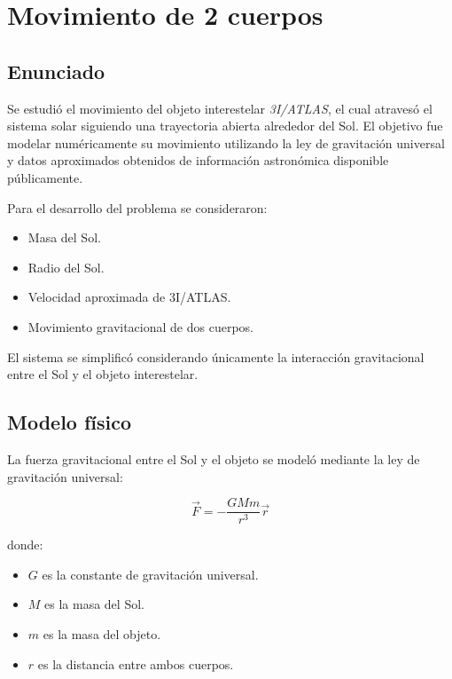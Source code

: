\section{Movimiento de 2 cuerpos}

\subsection{Enunciado}

Se estudió el movimiento del objeto interestelar \textit{3I/ATLAS}, el cual atravesó el sistema solar siguiendo una trayectoria abierta alrededor del Sol. El objetivo fue modelar numéricamente su movimiento utilizando la ley de gravitación universal y datos aproximados obtenidos de información astronómica disponible públicamente.

Para el desarrollo del problema se consideraron:

\begin{itemize}
    \item Masa del Sol.
    \item Radio del Sol.
    \item Velocidad aproximada de 3I/ATLAS.
    \item Movimiento gravitacional de dos cuerpos.
\end{itemize}

El sistema se simplificó considerando únicamente la interacción gravitacional entre el Sol y el objeto interestelar.

\subsection{Modelo físico}

La fuerza gravitacional entre el Sol y el objeto se modeló mediante la ley de gravitación universal:

\begin{equation}
    \vec{F} = - \frac{GMm}{r^3}\vec{r}
\end{equation}

donde:

\begin{itemize}
    \item $G$ es la constante de gravitación universal.
    \item $M$ es la masa del Sol.
    \item $m$ es la masa del objeto.
    \item $r$ es la distancia entre ambos cuerpos.
\end{itemize}

